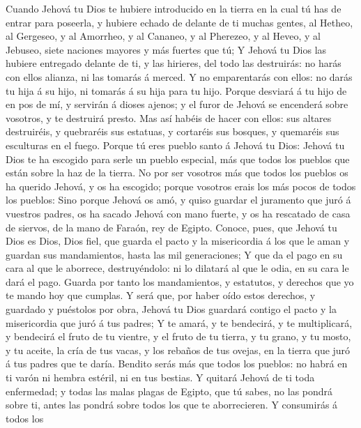  Cuando Jehová tu Dios te hubiere introducido en la tierra
en la cual tú has de entrar para poseerla, y hubiere echado de delante
de ti muchas gentes, al Hetheo, al Gergeseo, y al Amorrheo, y al
Cananeo, y al Pherezeo, y al Heveo, y al Jebuseo, siete naciones mayores
y más fuertes que tú;  Y Jehová tu Dios las hubiere
entregado delante de ti, y las hirieres, del todo las destruirás: no
harás con ellos alianza, ni las tomarás á merced.  Y no
emparentarás con ellos: no darás tu hija á su hijo, ni tomarás á su hija
para tu hijo.  Porque desviará á tu hijo de en pos de mí, y
servirán á dioses ajenos; y el furor de Jehová se encenderá sobre
vosotros, y te destruirá presto.  Mas así habéis de hacer
con ellos: sus altares destruiréis, y quebraréis sus estatuas, y
cortaréis sus bosques, y quemaréis sus esculturas en el fuego.
 Porque tú eres pueblo santo á Jehová tu Dios: Jehová tu
Dios te ha escogido para serle un pueblo especial, más que todos los
pueblos que están sobre la haz de la tierra.  No por ser
vosotros más que todos los pueblos os ha querido Jehová, y os ha
escogido; porque vosotros erais los más pocos de todos los pueblos:
 Sino porque Jehová os amó, y quiso guardar el juramento que
juró á vuestros padres, os ha sacado Jehová con mano fuerte, y os ha
rescatado de casa de siervos, de la mano de Faraón, rey de Egipto.
 Conoce, pues, que Jehová tu Dios es Dios, Dios fiel, que
guarda el pacto y la misericordia á los que le aman y guardan sus
mandamientos, hasta las mil generaciones;  Y que da el pago
en su cara al que le aborrece, destruyéndolo: ni lo dilatará al que le
odia, en su cara le dará el pago.  Guarda por tanto los
mandamientos, y estatutos, y derechos que yo te mando hoy que cumplas.
 Y será que, por haber oído estos derechos, y guardado y
puéstolos por obra, Jehová tu Dios guardará contigo el pacto y la
misericordia que juró á tus padres;  Y te amará, y te
bendecirá, y te multiplicará, y bendecirá el fruto de tu vientre, y el
fruto de tu tierra, y tu grano, y tu mosto, y tu aceite, la cría de tus
vacas, y los rebaños de tus ovejas, en la tierra que juró á tus padres
que te daría.  Bendito serás más que todos los pueblos: no
habrá en ti varón ni hembra estéril, ni en tus bestias.  Y
quitará Jehová de ti toda enfermedad; y todas las malas plagas de
Egipto, que tú sabes, no las pondrá sobre ti, antes las pondrá sobre
todos los que te aborrecieren.  Y consumirás á todos los
